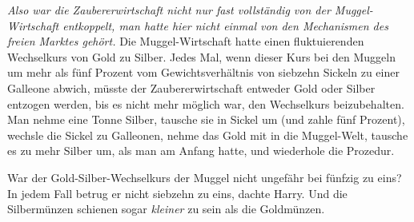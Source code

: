\emph{Also war die Zaubererwirtschaft nicht nur fast vollständig von der Muggel-Wirtschaft entkoppelt, man hatte hier nicht einmal von den Mechanismen des freien Marktes gehört.} Die Muggel-Wirtschaft hatte einen fluktuierenden Wechselkurs von Gold zu Silber. Jedes Mal, wenn dieser Kurs bei den Muggeln um mehr als fünf Prozent vom Gewichtsverhältnis von siebzehn Sickeln zu einer Galleone abwich, müsste der Zaubererwirtschaft entweder Gold oder Silber entzogen werden, bis es nicht mehr möglich war, den Wechselkurs beizubehalten. Man nehme eine Tonne Silber, tausche sie in Sickel um (und zahle fünf Prozent), wechsle die Sickel zu Galleonen, nehme das Gold mit in die Muggel-Welt, tausche es zu mehr Silber um, als man am Anfang hatte, und wiederhole die Prozedur.

War der Gold-Silber-Wechselkurs der Muggel nicht ungefähr bei fünfzig zu eins? In jedem Fall betrug er nicht siebzehn zu eins, dachte Harry. Und die Silbermünzen schienen sogar \emph{kleiner} zu sein als die Goldmünzen.

